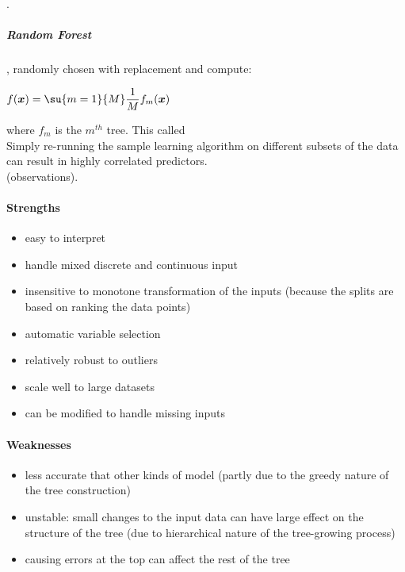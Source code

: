 .
\subparagraph{Random Forest}
, randomly chosen with replacement and compute:
\begin{center}
    $f(\bm{x}) = \su{m=1}{M}\dfrac{1}{M}f_{m}(\bm{x})$
\end{center}
where $f_{m}$ is the $m^{th}$ tree. This called \\
Simply re-running the sample learning algorithm on different subsets of the data can
result in highly correlated predictors.\\
 (observations). 




 


\paragraph{Strengths}
\begin{itemize}
    \item easy to interpret
    \item handle mixed discrete and continuous input
    \item insensitive to monotone transformation of the inputs (because the splits
        are based on ranking the data points)
    \item automatic variable selection 
    \item relatively robust to outliers
    \item scale well to large datasets
    \item can be modified to handle missing inputs
\end{itemize}


\paragraph{Weaknesses}
\begin{itemize}
    \item less accurate that other kinds of model (partly due to the greedy nature of
        the tree construction)
    \item unstable: small changes to the input data can have large effect on the 
        structure of the tree (due to hierarchical nature of the tree-growing process)
    \item causing errors at the top can affect the rest of the tree
\end{itemize}


